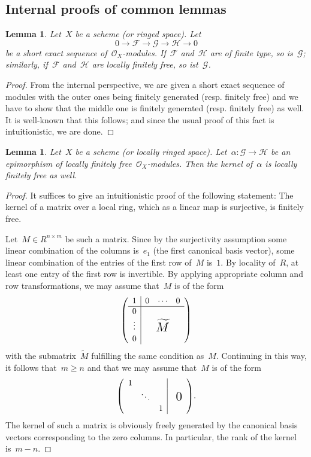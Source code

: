 \documentclass[10pt]{amsart}
\theoremstyle{definition}
\theoremstyle{plain}
\newtheorem{lemma}[defn]{Lemma}
\theoremstyle{remark}
\newcommand{\F}{\mathcal{F}}
\newcommand{\G}{\mathcal{G}}
\renewcommand{\H}{\mathcal{H}}
\renewcommand{\O}{\mathcal{O}}
\newcommand{\?}{\,{:}\,}
\renewcommand{\_}{\mathpunct{.}\,}
\newcommand{\lra}{\longrightarrow}
\begin{document}
\subsection{Internal proofs of common lemmas}

\begin{lemma}Let~$X$ be a scheme (or ringed space). Let
\[ 0 \lra \F \lra \G \lra \H \lra 0 \]
be a short exact sequence of~$\O_X$-modules. If~$\F$ and~$\H$ are of finite
type, so is~$\G$; similarly, if~$\F$ and~$\H$ are locally finitely free, so
ist~$\G$.
\end{lemma}
\begin{proof}From the internal perspective, we are given a short exact sequence
of modules with the outer ones being finitely generated (resp. finitely free)
and we have to show that the middle one is finitely generated (resp. finitely
free) as well. It is well-known that this follows; and since the usual proof of
this fact is intuitionistic, we are done.
\end{proof}

\begin{lemma}\label{lemma:kernel-of-epi-fingen}
Let~$X$ be a scheme (or locally ringed space). Let~$\alpha : \G
\to \H$ be an epimorphism of locally finitely free~$\O_X$-modules. Then the
kernel of~$\alpha$ is locally finitely free as well.\end{lemma}
\begin{proof}It suffices to give an intuitionistic proof of the following
statement: The kernel of a matrix over a local ring, which as a linear map is
surjective, is finitely free.

Let~$M \in R^{n \times m}$ be such a matrix. Since by the surjectivity
assumption some linear combination of the columns is~$e_1$ (the first canonical
basis vector), some linear combination of the entries of the first row of~$M$
is~$1$. By locality of~$R$, at least one entry of the first row is invertible.
By applying appropriate column and row transformations, we may assume that~$M$
is of the form
\[ \left(
  \begin{array}{c|ccc}
    1 & 0 & \cdots & 0 \\ \hline
    0 & \multicolumn{3}{c}{\multirow{3}{*}{\raisebox{-5mm}{\scalebox{1.5}{$\widetilde M$}}}} \\
    \raisebox{2pt}{\vdots} & & & \\
    0 & & &
  \end{array}
\right) \]
with the submatrix~$\widetilde M$ fulfilling the same condition as~$M$.
Continuing in this way, it follows that~$m \geq n$ and that we may assume
that~$M$ is of the form
\[ \left(
  \begin{array}{ccc|c}
    1 & & & \multirow{3}{*}{\raisebox{-3mm}{\scalebox{1.5}{\ 0}}} \\
    & \ddots && \\
    && 1
  \end{array}
\right)\!. \]
The kernel of such a matrix is obviously freely generated by the canonical
basis vectors corresponding to the zero columns. In particular, the rank of the
kernel is~$m-n$.
\end{proof}
\end{document}
